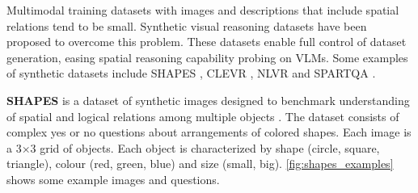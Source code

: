 Multimodal training datasets with images and descriptions that include spatial relations tend to be small. Synthetic visual reasoning datasets have been proposed to overcome this problem. These datasets enable full control of dataset generation, easing spatial reasoning capability probing  on VLMs. Some examples of synthetic datasets include SHAPES \cite{andreas2016neural}, CLEVR \cite{johnson2017clevr}, NLVR \cite{suhr-etal-2017-corpus} and SPARTQA \cite{mirzaee-etal-2021-spartqa}.

\textbf{SHAPES} is a dataset of synthetic images designed to benchmark understanding of spatial and logical relations among multiple objects \cite{andreas2016neural}. The dataset consists of complex yes or no questions about arrangements of colored shapes. Each image is a 3×3 grid of objects. Each object is characterized by shape (circle, square, triangle), colour (red, green, blue) and size (small, big). \cref{fig:shapes_examples} shows some example images and questions.

